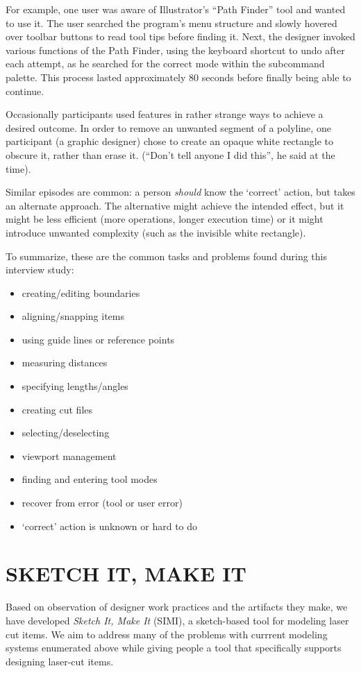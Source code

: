 \documentclass{article}
\begin{document}
For example, one user was aware of Illustrator's ``Path Finder'' tool
and wanted to use it. The user searched the program's menu structure
and slowly hovered over toolbar buttons to read tool tips before
finding it. Next, the designer invoked various functions of the Path
Finder, using the keyboard shortcut to undo after each attempt, as he
searched for the correct mode within the subcommand palette. This
process lasted approximately 80 seconds before finally being able to
continue.

Occasionally participants used features in rather strange ways to
achieve a desired outcome. In order to remove an unwanted segment of a
polyline, one participant (a graphic designer) chose to create an
opaque white rectangle to obscure it, rather than erase it. (``Don't
tell anyone I did this'', he said at the time). 

Similar episodes are common: a person \textit{should} know the
`correct' action, but takes an alternate approach. The alternative
might achieve the intended effect, but it might be less efficient
(more operations, longer execution time) or it might introduce
unwanted complexity (such as the invisible white rectangle).

To summarize, these are the common tasks and problems found during
this interview study:

\begin{itemize}
\item creating/editing boundaries
\item aligning/snapping items
\item using guide lines or reference points
\item measuring distances
\item specifying lengths/angles
\item creating cut files
\item selecting/deselecting
\item viewport management
\item finding and entering tool modes
\item recover from error (tool or user error)
\item `correct' action is unknown or hard to do
\end{itemize}

\section{SKETCH IT, MAKE IT}

Based on observation of designer work practices and the artifacts they
make, we have developed \textit{Sketch It, Make It} (SIMI), a
sketch-based tool for modeling laser cut items. We aim to address many
of the problems with currrent modeling systems enumerated above while
giving people a tool that specifically supports designing laser-cut
items.
\end{document}
